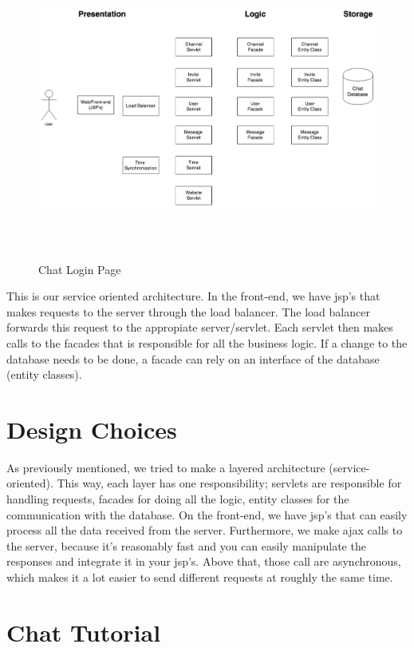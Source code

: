 \documentclass[11pt]{article}
\begin{document}
\begin{figure}[H]
\centering
\includegraphics[height=100mm]{architecture.png}
\caption{Chat Login Page}
\end{figure}

This is our service oriented architecture. In the front-end, we have jsp's that makes requests to the server through the load balancer. The load balancer forwards this request to the appropiate server/servlet. Each servlet then makes calls to the facades that is responsible for all the business logic. If a change to the database needs to be done, a facade can rely on an interface of the database (entity classes).

\section{Design Choices}

As previously mentioned, we tried to make a layered architecture (service-oriented). This way, each layer has one responsibility; servlets are responsible for handling requests, facades for doing all the logic, entity classes for the communication with the database. On the front-end, we have jsp's that can easily process all the data received from the server. Furthermore, we make ajax calls to the server, because it's reasonably fast and you can easily manipulate the responses and integrate it in your jsp's. Above that, those call are asynchronous, which makes it a lot easier to send different requests at roughly the same time.

\section{Chat Tutorial}
\end{document}
